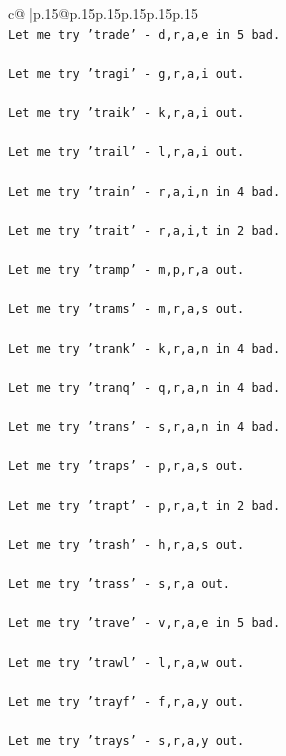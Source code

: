\documentclass{article}
\begin{document}
{\begin{supertabular}{c@{$\;$}|p{.15\linewidth}@{}p{.15\linewidth}p{.15\linewidth}p{.15\linewidth}p{.15\linewidth}p{.15\linewidth}}
{{{\\ 
\texttt{Let me try 'trade' {-} d,r,a,e in 5 bad. } \\
\\ 
\texttt{Let me try 'tragi' {-} g,r,a,i out. } \\
\\ 
\texttt{Let me try 'traik' {-} k,r,a,i out. } \\
\\ 
\texttt{Let me try 'trail' {-} l,r,a,i out. } \\
\\ 
\texttt{Let me try 'train' {-} r,a,i,n in 4 bad. } \\
\\ 
\texttt{Let me try 'trait' {-} r,a,i,t in 2 bad. } \\
\\ 
\texttt{Let me try 'tramp' {-} m,p,r,a out. } \\
\\ 
\texttt{Let me try 'trams' {-} m,r,a,s out. } \\
\\ 
\texttt{Let me try 'trank' {-} k,r,a,n in 4 bad. } \\
\\ 
\texttt{Let me try 'tranq' {-} q,r,a,n in 4 bad. } \\
\\ 
\texttt{Let me try 'trans' {-} s,r,a,n in 4 bad. } \\
\\ 
\texttt{Let me try 'traps' {-} p,r,a,s out. } \\
\\ 
\texttt{Let me try 'trapt' {-} p,r,a,t in 2 bad. } \\
\\ 
\texttt{Let me try 'trash' {-} h,r,a,s out. } \\
\\ 
\texttt{Let me try 'trass' {-} s,r,a out. } \\
\\ 
\texttt{Let me try 'trave' {-} v,r,a,e in 5 bad. } \\
\\ 
\texttt{Let me try 'trawl' {-} l,r,a,w out. } \\
\\ 
\texttt{Let me try 'trayf' {-} f,r,a,y out. } \\
\\ 
\texttt{Let me try 'trays' {-} s,r,a,y out. } \\
\\ 
}}}
\end{supertabular}}
\end{document}

